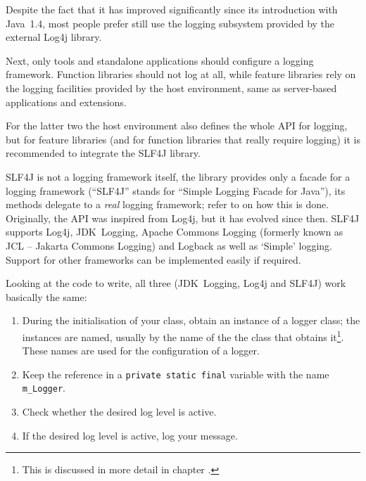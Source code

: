 Despite the fact that it has improved significantly since its introduction with Java~1.4, most people prefer still use the logging subsystem provided by the external Log4j\autocite{APACHE_LOG4J} library.

Next, only tools and standalone applications should configure a logging framework. Function libraries should not log at all, while feature libraries rely on the logging facilities provided by the host environment, same as server-based applications and extensions.

For the latter two the host environment also defines the whole API for logging, but for feature libraries (and for function libraries that really require logging) it is recommended to integrate the SLF4J\autocite{SLF4J} library.

SLF4J is not a logging framework itself, the library provides only a facade for a logging framework (“SLF4J” stands for “Simple Logging Facade for Java”), its methods delegate to a \textit{real} logging framework; refer to \autocite{SLF4J:Binding} on how this is done. Originally, the API was inspired from Log4j, but it has evolved since then. SLF4J supports Log4j, JDK~Logging, Apache Commons Logging\autocite{APACHE_COMMONS_LOGGING} (formerly known as JCL – Jakarta Commons Logging) and Logback\autocite{LOGBACK} as well as ‘Simple’ logging. Support for other frameworks can be implemented easily if required.

Looking at the code to write, all three (JDK~Logging, Log4j and SLF4J) work basically the same:
\begin{enumerate}[nosep]
\item{During the initialisation of your class, obtain an instance of a logger class; the instances are named, usually by the name of the the class that obtains it\footnote{This is discussed in more detail in chapter .}. These names are used for the configuration of a logger.}

\item{Keep the reference in a \lstinline|private static final| variable with the name \lstinline|m_Logger|.}

\item{Check whether the desired log level is active.}

\item{If the desired log level is active, log your message.}
\end{enumerate}

